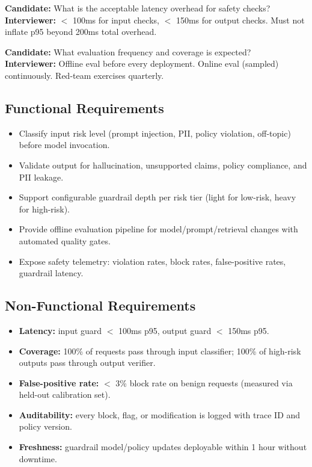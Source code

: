 \textbf{Candidate:} What is the acceptable latency overhead for safety checks?\\
\textbf{Interviewer:} $<$ 100ms for input checks, $<$ 150ms for output checks. Must not inflate p95 beyond 200ms total overhead.

\textbf{Candidate:} What evaluation frequency and coverage is expected?\\
\textbf{Interviewer:} Offline eval before every deployment. Online eval (sampled) continuously. Red-team exercises quarterly.

\subsection*{Functional Requirements}

\begin{itemize}
  \item Classify input risk level (prompt injection, PII, policy violation, off-topic) before model invocation.
  \item Validate output for hallucination, unsupported claims, policy compliance, and PII leakage.
  \item Support configurable guardrail depth per risk tier (light for low-risk, heavy for high-risk).
  \item Provide offline evaluation pipeline for model/prompt/retrieval changes with automated quality gates.
  \item Expose safety telemetry: violation rates, block rates, false-positive rates, guardrail latency.
\end{itemize}

\subsection*{Non-Functional Requirements}

\begin{itemize}
  \item \textbf{Latency:} input guard $<$ 100ms p95, output guard $<$ 150ms p95.
  \item \textbf{Coverage:} 100\% of requests pass through input classifier; 100\% of high-risk outputs pass through output verifier.
  \item \textbf{False-positive rate:} $<$ 3\% block rate on benign requests (measured via held-out calibration set).
  \item \textbf{Auditability:} every block, flag, or modification is logged with trace ID and policy version.
  \item \textbf{Freshness:} guardrail model/policy updates deployable within 1 hour without downtime.
\end{itemize}

